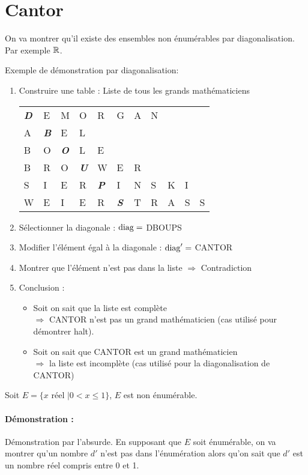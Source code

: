 \section{Cantor}
\label{sec:cantor}
On va montrer qu'il existe des ensembles non énumérables par diagonalisation. Par exemple $\mathbb{R}$.
\begin{myexem}
	Exemple de démonstration par diagonalisation:
	\begin{enumerate}
		\item Construire une table : Liste de tous les grands
			mathématiciens \\
			\begin{tabular}{lllllllllll}
				\emph{\textbf{D}}&E& M&O&R&G&A&N&&& \\
				A&\emph{\textbf{B}}&E&L&&&&&&&\\
				B&O&\emph{\textbf{O}}&L&E&&&&&&\\
				B&R&O&\emph{\textbf{U}}&W&E&R&&&&\\
				S&I&E&R&\emph{\textbf{P}}&I&N&S&K&I&\\
				W&E&I&E&R&\emph{\textbf{S}}&T&R&A&S&S\\
			\end{tabular}
		\item Sélectionner la diagonale : $\operatorname{diag} = $ DBOUPS
		\item Modifier l'élément égal à la diagonale : $\operatorname{diag}' =$ CANTOR
		\item Montrer que l'élément n'est pas dans la liste $\Rightarrow$ Contradiction
		\item Conclusion :
			\begin{itemize}
				\item Soit on sait que la liste est complète\\
					$ \Rightarrow$ CANTOR n'est pas un grand
				mathématicien (cas utilisé pour démontrer
				halt).
				\item Soit on sait que CANTOR est un grand
					mathématicien \\
					$ \Rightarrow$ la liste est incomplète
				(cas utilisé pour la diagonalisation de CANTOR)
			\end{itemize}
	\end{enumerate}
\end{myexem}

\begin{mytheo}
	Soit $E = \{ x \text{ réel }| 0<x\leq1\}$, $E$ est non énumérable.
\end{mytheo}

\paragraph{Démonstration :}
Démonstration par l'absurde.  En supposant que $E$ soit énumérable, on va montrer qu'un nombre $d'$ n'est pas dans l'énumération alors qu'on sait
que $d'$ est un nombre réel compris entre 0 et 1.

